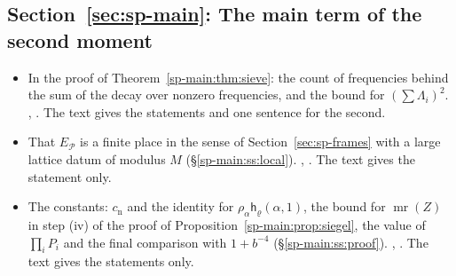 \subsection*{Section~\ref{sec:sp-main}: The main term of the second moment}
\begin{itemize}[leftmargin=2em,itemsep=1pt]
\item In the proof of Theorem~\ref{sp-main:thm:sieve}: the count of frequencies behind the sum of the
  decay over nonzero frequencies, and the bound for $(\sum\Lambda_i)^2$.
  , . The text gives the
  statements and one sentence for the second.
\item That $E_{\mathcal P}$ is a finite place in the sense of Section~\ref{sec:sp-frames} with a
  large lattice datum of modulus $M$ (\S\ref{sp-main:ss:local}). ,
  . The text gives the statement only.
\item The constants: $c_{\mathrm n}$ and the identity for $\rho_\alpha\mathsf h_\varrho(\alpha,1)$, the
  bound for $\operatorname{mr}(Z)$ in step (iv) of the proof of Proposition~\ref{sp-main:prop:siegel},
  the value of $\prod_iP_i$ and the final comparison with $1+b^{-4}$ (\S\ref{sp-main:ss:proof}).
  ,
  . The text gives the statements only.
\end{itemize}

